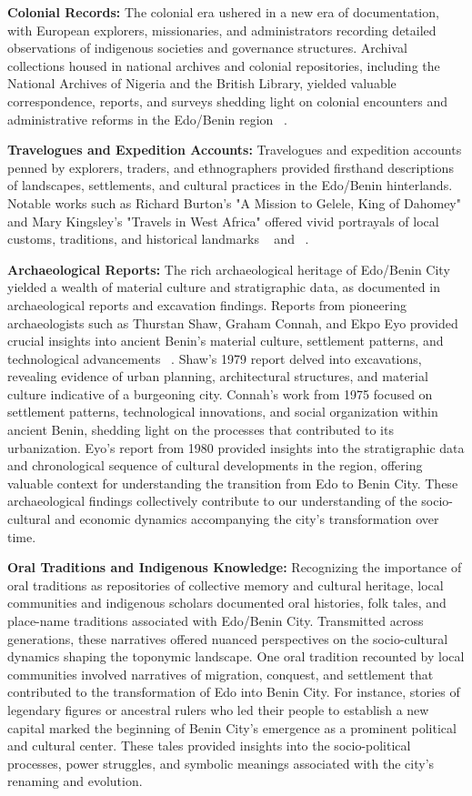 \textbf{Colonial Records:} The colonial era ushered in a new era of documentation, with European explorers, missionaries, and administrators recording detailed observations of indigenous societies and governance structures. Archival collections housed in national archives and colonial repositories, including the National Archives of Nigeria and the British Library, yielded valuable correspondence, reports, and surveys shedding light on colonial encounters and administrative reforms in the Edo/Benin region ~\cite{oliver1985}.

\textbf{Travelogues and Expedition Accounts:} Travelogues and expedition accounts penned by explorers, traders, and ethnographers provided firsthand descriptions of landscapes, settlements, and cultural practices in the Edo/Benin hinterlands. Notable works such as Richard Burton's "A Mission to Gelele, King of Dahomey" and Mary Kingsley's "Travels in West Africa" offered vivid portrayals of local customs, traditions, and historical landmarks ~\cite{burton2011} and ~\cite{kingsley1988}.

\textbf{Archaeological Reports:} The rich archaeological heritage of Edo/Benin City yielded a wealth of material culture and stratigraphic data, as documented in archaeological reports and excavation findings. Reports from pioneering archaeologists such as Thurstan Shaw, Graham Connah, and Ekpo Eyo provided crucial insights into ancient Benin's material culture, settlement patterns, and technological advancements ~\cite{shaw1970,connah1975}. Shaw's 1979 report delved into excavations, revealing evidence of urban planning, architectural structures, and material culture indicative of a burgeoning city. Connah's work from 1975 focused on settlement patterns, technological innovations, and social organization within ancient Benin, shedding light on the processes that contributed to its urbanization. Eyo's report from 1980 provided insights into the stratigraphic data and chronological sequence of cultural developments in the region, offering valuable context for understanding the transition from Edo to Benin City. These archaeological findings collectively contribute to our understanding of the socio-cultural and economic dynamics accompanying the city's transformation over time.

\textbf{Oral Traditions and Indigenous Knowledge:} Recognizing the importance of oral traditions as repositories of collective memory and cultural heritage, local communities and indigenous scholars documented oral histories, folk tales, and place-name traditions associated with Edo/Benin City. Transmitted across generations, these narratives offered nuanced perspectives on the socio-cultural dynamics shaping the toponymic landscape. One oral tradition recounted by local communities involved narratives of migration, conquest, and settlement that contributed to the transformation of Edo into Benin City. For instance, stories of legendary figures or ancestral rulers who led their people to establish a new capital marked the beginning of Benin City's emergence as a prominent political and cultural center. These tales provided insights into the socio-political processes, power struggles, and symbolic meanings associated with the city's renaming and evolution.

